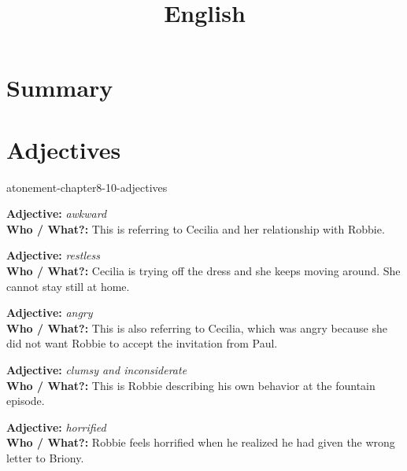 \documentclass[preview]{standalone}
\begin{document}
\title{English}
\genpage

\section{Summary}

\section{Adjectives}

\begin{snippet}{atonement-chapter8-10-adjectives}
\begin{minipage}[l]{0.05\textwidth}
\end{minipage}
\begin{minipage}[r]{0.95\textwidth}
    \textbf{Adjective:} \textit{awkward}
    \\
    \textbf{Who / What?:} This is referring to Cecilia and her relationship with Robbie.
\end{minipage}
\hr
\begin{minipage}[l]{0.05\textwidth}
\end{minipage}
\begin{minipage}[r]{0.95\textwidth}
    \textbf{Adjective:} \textit{restless}
    \\
    \textbf{Who / What?:} Cecilia is trying off the dress and she keeps moving around.
    She cannot stay still at home.
\end{minipage}
\hr
\begin{minipage}[l]{0.05\textwidth}
\end{minipage}
\begin{minipage}[r]{0.95\textwidth}
    \textbf{Adjective:} \textit{angry}
    \\
    \textbf{Who / What?:} This is also referring to Cecilia, which was angry because
    she did not want Robbie to accept the invitation from Paul.
\end{minipage}
\hr
\begin{minipage}[l]{0.05\textwidth}
\end{minipage}
\begin{minipage}[r]{0.95\textwidth}
    \textbf{Adjective:} \textit{clumsy and inconsiderate}
    \\
    \textbf{Who / What?:} This is Robbie describing his own behavior
    at the fountain episode.
\end{minipage}
\hr
\begin{minipage}[l]{0.05\textwidth}
\end{minipage}
\begin{minipage}[r]{0.95\textwidth}
    \textbf{Adjective:} \textit{horrified}
    \\
    \textbf{Who / What?:} Robbie feels horrified when he realized he had given
    the wrong letter to Briony.
\end{minipage}
\end{snippet}
\end{document}
